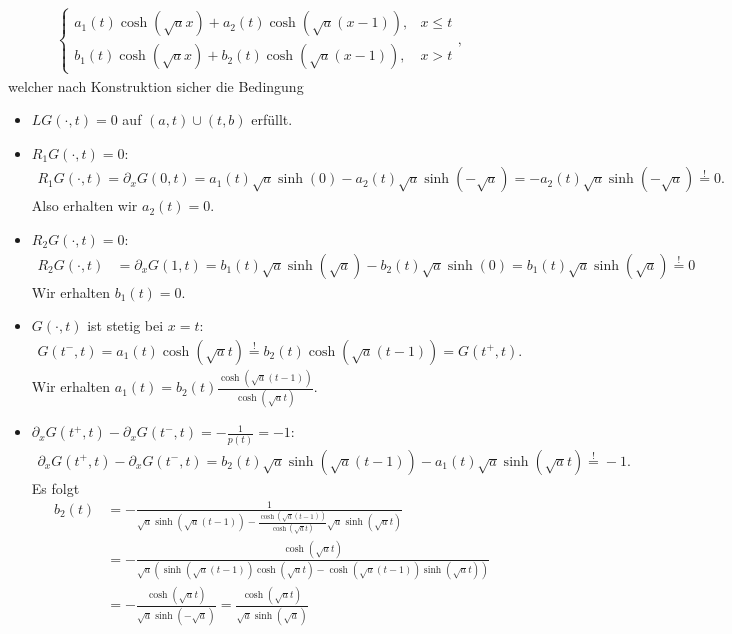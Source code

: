 \begin{solution}
\begin{enumerate}[label = \textbf{\alph*)}]
\begin{align*}
\begin{cases}
      a_1(t)\cosh(\sqrt{a}x) + a_2(t)\cosh(\sqrt{a}(x-1)), & x \leq t \\
      b_1(t)\cosh(\sqrt{a}x) + b_2(t)\cosh(\sqrt{a}(x-1)), & x > t
    \end{cases},
  \end{align*}
  welcher nach Konstruktion sicher die Bedingung
  \begin{itemize}
    \item $LG(\cdot,t) = 0$ auf $(a,t) \cup (t,b)$ erfüllt.
    \item $R_1G(\cdot,t) = 0$:
    \begin{align*}
      R_1G(\cdot,t) = \partial_xG(0,t) = a_1(t)\sqrt{a}\sinh(0) - a_2(t)\sqrt{a}\sinh(-\sqrt{a}) =  - a_2(t)\sqrt{a}\sinh(-\sqrt{a}) \stackrel{!}{=} 0.
    \end{align*}
    Also erhalten wir $a_2(t) = 0$.
    \item $R_2G(\cdot,t) = 0$:
    \begin{align*}
      R_2G(\cdot,t) &= \partial_xG(1,t) = b_1(t)\sqrt{a}\sinh(\sqrt{a}) - b_2(t)\sqrt{a}\sinh(0)
      = b_1(t)\sqrt{a}\sinh(\sqrt{a}) \stackrel{!}{=} 0
    \end{align*}
    Wir erhalten $b_1(t) = 0$.
    \item $G(\cdot,t)$ ist stetig bei $x = t$: \\
    \begin{align*}
      G(t^-,t) = a_1(t)\cosh(\sqrt{a}t) \stackrel{!}{=}
      b_2(t)\cosh(\sqrt{a}(t-1)) = G(t^+,t).
    \end{align*}
    Wir erhalten $a_1(t) = b_2(t)\frac{\cosh(\sqrt{a}(t-1))}{\cosh(\sqrt{a}t)}$.
    \item $\partial_x G(t^+,t)- \partial_x G(t^-,t) = - \frac{1}{p(t)} = -1$:
    \begin{align*}
      \partial_x G(t^+,t)- \partial_x G(t^-,t) =
      b_2(t)\sqrt{a}\sinh(\sqrt{a}(t-1)) - a_1(t)\sqrt{a}\sinh(\sqrt{a}t) \stackrel{!}{=} -1.
    \end{align*}
    Es folgt
    \begin{align*}
      b_2(t) &= -\frac{1}{\sqrt{a}\sinh(\sqrt{a}(t-1)) - \frac{\cosh(\sqrt{a}(t-1))}{\cosh(\sqrt{a}t)}\sqrt{a}\sinh(\sqrt{a}t)} \\
      &= -\frac{\cosh(\sqrt{a}t)}{\sqrt{a}\left(\sinh(\sqrt{a}(t-1))\cosh(\sqrt{a}t) - \cosh(\sqrt{a}(t-1))\sinh(\sqrt{a}t)\right)} \\
      &= -\frac{\cosh(\sqrt{a}t)}{\sqrt{a}\sinh(-\sqrt{a})}
      = \frac{\cosh(\sqrt{a}t)}{\sqrt{a}\sinh(\sqrt{a})}
    \end{align*}

\end{itemize}
\end{enumerate}
\end{solution}
